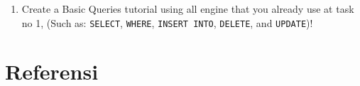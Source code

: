 \documentclass[
]{book}
\providecommand{\tightlist}{%
  \setlength{\itemsep}{0pt}\setlength{\parskip}{0pt}}
\begin{document}
\begin{enumerate}
\def\labelenumi{\arabic{enumi}.}
\setcounter{enumi}{1}
\tightlist
\item
  Create a Basic Queries tutorial using all engine that you already use at task no 1, (Such as: \texttt{SELECT}, \texttt{WHERE}, \texttt{INSERT\ INTO}, \texttt{DELETE}, and \texttt{UPDATE})!
\end{enumerate}

\hypertarget{referensi}{%
\chapter{Referensi}\label{referensi}}

  
\end{document}
